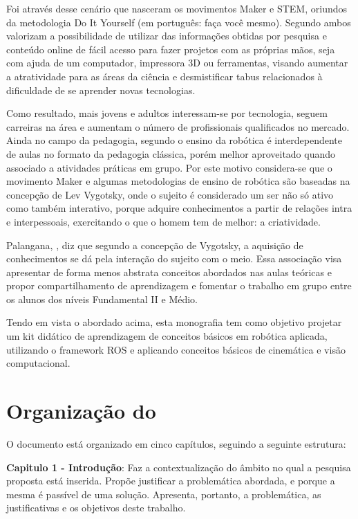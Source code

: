 Foi através desse cenário que nasceram os movimentos Maker e STEM, oriundos da metodologia Do It Yourself (em português: faça você mesmo). Segundo \cite{Pugliese} ambos valorizam a possibilidade de utilizar das informações obtidas por pesquisa e conteúdo online de fácil acesso para fazer projetos com as próprias mãos, seja com ajuda de um computador, impressora 3D ou ferramentas, visando aumentar a atratividade para as áreas da ciência e desmistificar tabus relacionados à dificuldade
de se aprender novas tecnologias.
 
Como resultado, mais jovens e adultos interessam-se por tecnologia, seguem carreiras na área e aumentam o número de profissionais qualificados no mercado.
Ainda no campo da pedagogia, segundo \cite{Mataric} o ensino da robótica é interdependente de aulas no formato da pedagogia clássica, porém melhor aproveitado quando associado a atividades práticas em grupo. Por este motivo considera-se que o movimento Maker e algumas metodologias de ensino de robótica são baseadas na concepção de Lev Vygotsky, onde o sujeito é considerado um ser não só ativo como também interativo, porque adquire conhecimentos a partir de relações intra e interpessoais, exercitando o que o homem tem de melhor: a criatividade.
 
Palangana, \cite{Palangana}, diz que segundo a concepção de Vygotsky, a aquisição de conhecimentos se dá pela interação do sujeito com o meio. Essa associação visa apresentar de forma menos abstrata conceitos abordados nas aulas teóricas e propor compartilhamento de aprendizagem e fomentar o trabalho em grupo entre os alunos dos níveis Fundamental II e Médio.
 
Tendo em vista o abordado acima, esta monografia tem como objetivo projetar um kit didático de aprendizagem de conceitos básicos em robótica aplicada, utilizando o framework ROS e aplicando conceitos básicos de cinemática e visão computacional.

\section{Organização do \thetypework}
\label{section:organizacao}
O documento está organizado em cinco capítulos, seguindo a seguinte estrutura:

\textbf{Capitulo 1 - Introdução}: Faz a contextualização do âmbito no qual a pesquisa proposta
está inserida. Propõe justificar a problemática abordada, e porque a mesma é passível de uma solução. Apresenta, portanto, a problemática, as justificativas e os objetivos deste trabalho.


